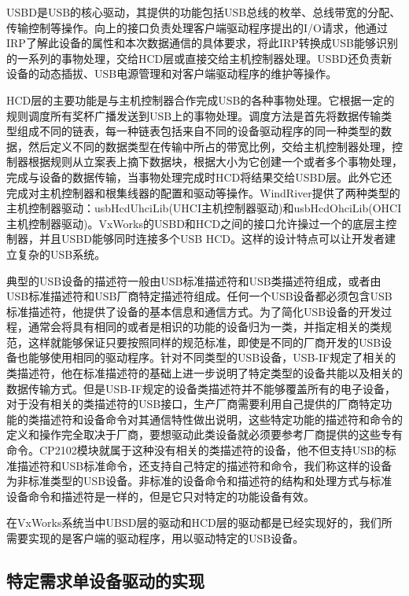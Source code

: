 	USBD是USB的核心驱动，其提供的功能包括USB总线的枚举、总线带宽的分配、传输控制等操作。向上的接口负责处理客户端驱动程序提出的I/O请求，他通过IRP了解此设备的属性和本次数据通信的具体要求，将此IRP转换成USB能够识别的一系列的事物处理，交给HCD层或直接交给主机控制器处理。USBD还负责新设备的动态插拔、USB电源管理和对客户端驱动程序的维护等操作。
	
	HCD层的主要功能是与主机控制器合作完成USB的各种事物处理。它根据一定的规则调度所有奖杯广播发送到USB上的事物处理。调度方法是首先将数据传输类型组成不同的链表，每一种链表包括来自不同的设备驱动程序的同一种类型的数据，然后定义不同的数据类型在传输中所占的带宽比例，交给主机控制器处理，控制器根据规则从立案表上摘下数据块，根据大小为它创建一个或者多个事物处理，完成与设备的数据传输，当事物处理完成时HCD将结果交给USBD层。此外它还完成对主机控制器和根集线器的配置和驱动等操作。WindRiver提供了两种类型的主机控制器驱动：usbHcdUhciLib(UHCI主机控制器驱动)和usbHcdOhciLib(OHCI主机控制器驱动)。VxWorks的USBD和HCD之间的接口允许操过一个的底层主控制器，并且USBD能够同时连接多个USB HCD。这样的设计特点可以让开发者建立复杂的USB系统。
	
	典型的USB设备的描述符一般由USB标准描述符和USB类描述符组成，或者由USB标准描述符和USB厂商特定描述符组成。任何一个USB设备都必须包含USB标准描述符，他提供了设备的基本信息和通信方式。为了简化USB设备的开发过程，通常会将具有相同的或者是相识的功能的设备归为一类，并指定相关的类规范，这样就能够保证只要按照同样的规范标准，即使是不同的厂商开发的USB设备也能够使用相同的驱动程序。针对不同类型的USB设备，USB-IF规定了相关的类描述符，他在标准描述符的基础上进一步说明了特定类型的设备共能以及相关的数据传输方式。但是USB-IF规定的设备类描述符并不能够覆盖所有的电子设备，对于没有相关的类描述符的USB接口，生产厂商需要利用自己提供的厂商特定功能的类描述符和设备命令对其通信特性做出说明，这些特定功能的描述符和命令的定义和操作完全取决于厂商，要想驱动此类设备就必须要参考厂商提供的这些专有命令。CP2102模块就属于这种没有相关的类描述符的设备，他不但支持USB的标准描述符和USB标准命令，还支持自己特定的描述符和命令，我们称这样的设备为非标准类型的USB设备。非标准的设备命令和描述符的结构和处理方式与标准设备命令和描述符是一样的，但是它只对特定的功能设备有效。

	在VxWorks系统当中UBSD层的驱动和HCD层的驱动都是已经实现好的，我们所需要实现的是客户端的驱动程序，用以驱动特定的USB设备。	


\subsection{特定需求单设备驱动的实现}

